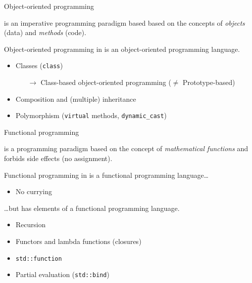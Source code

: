 \begin{frame}{Object-oriented programming}{}
  \begin{definition}
     is an imperative programming paradigm based based on the concepts of \emph{objects} (data) and \emph{methods} (code).
  \end{definition}
  \begin{block}{Object-oriented programming in \CCLang}
    \CCLang is an object-oriented programming language.
    \begin{itemize}
    \item
      Classes (\lstinline!class!)
      \begin{itemize}
      \item[$\to$]
        Class-based object-oriented programming ($\neq$ Prototype-based)
      \end{itemize}
    \item
      Composition and (multiple) inheritance
    \item
      Polymorphism (\lstinline!virtual! methods, \lstinline!dynamic_cast!)
    \end{itemize}
  \end{block}
\end{frame}

\begin{frame}{Functional programming}{}
  \begin{definition}
     is a programming paradigm based on the concept of \emph{mathematical functions} and forbids side effects (no assignment).
  \end{definition}
  \begin{block}{Functional programming in \CCLang}
    \CCLang is  a functional programming language\ldots
    \begin{itemize}
    \item
      No currying
    \end{itemize}
    \ldots but has elements of a functional programming language.
    \begin{itemize}
    \item
      Recursion
    \item
      Functors and lambda functions (closures)
    \item
      \lstinline!std::function!
    \item
      Partial evaluation (\lstinline!std::bind!)
    \end{itemize}
  \end{block}
\end{frame}

